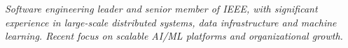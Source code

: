 {\selectfont
	\begin{justify}\textit{Software engineering leader and senior member of IEEE, with significant experience in large-scale distributed systems, data infrastructure and machine learning. Recent focus on scalable AI/ML platforms and organizational growth.}\end{justify}
}